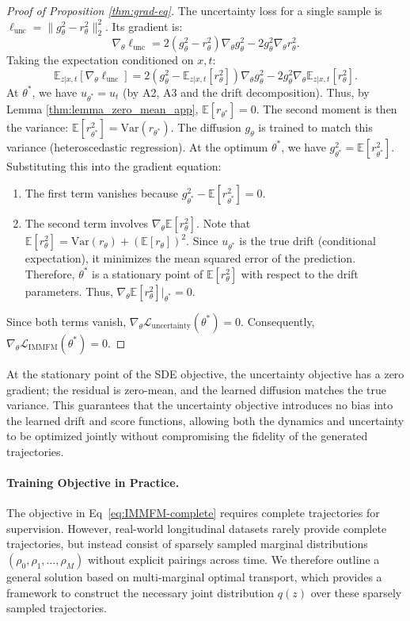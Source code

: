 \documentclass[twoside]{article}
\begin{document}
{{\begin{proof}[Proof of Proposition \ref{thm:grad-eq}]
The uncertainty loss for a single sample is $\ell_{\text{unc}} = \|g_\theta^2 - r_\theta^2\|_2^2$. Its gradient is:
\[
\nabla_\theta \ell_{\text{unc}} = 2(g_\theta^2 - r_\theta^2)\nabla_\theta g_\theta^2 - 2g_\theta^2 \nabla_\theta r_\theta^2.
\]
Taking the expectation conditioned on $x,t$:
\[
\mathbb{E}_{z|x,t}[\nabla_\theta \ell_{\text{unc}}] = 2(g_\theta^2 - \mathbb{E}_{z|x,t}[r_\theta^2])\nabla_\theta g_\theta^2 - 2g_\theta^2 \nabla_\theta \mathbb{E}_{z|x,t}[r_\theta^2].
\]
At $\theta^*$, we have $u_{\theta^*} = u_t$ (by A2, A3 and the drift decomposition). Thus, by Lemma \ref{thm:lemma_zero_mean_app}, $\mathbb{E}[r_{\theta^*}] = 0$.
The second moment is then the variance: $\mathbb{E}[r_{\theta^*}^2] = \text{Var}(r_{\theta^*})$.
The diffusion $g_{\theta}$ is trained to match this variance (heteroscedastic regression). At the optimum $\theta^*$, we have $g_{\theta^*}^2 = \mathbb{E}[r_{\theta^*}^2]$.
Substituting this into the gradient equation:
\begin{enumerate}
    \item The first term vanishes because $g_{\theta^*}^2 - \mathbb{E}[r_{\theta^*}^2] = 0$.
    \item The second term involves $\nabla_\theta \mathbb{E}[r_\theta^2]$. Note that $\mathbb{E}[r_\theta^2] = \text{Var}(r_\theta) + (\mathbb{E}[r_\theta])^2$. Since $u_{\theta^*}$ is the true drift (conditional expectation), it minimizes the mean squared error of the prediction. Therefore, $\theta^*$ is a stationary point of $\mathbb{E}[r_\theta^2]$ with respect to the drift parameters. Thus, $\nabla_\theta \mathbb{E}[r_\theta^2]|_{\theta^*} = 0$.
\end{enumerate}
Since both terms vanish, $\nabla_\theta \mathcal{L}_{\text{uncertainty}}(\theta^*) = 0$.
Consequently, $\nabla_\theta \mathcal{L}_{\text{IMMFM}}(\theta^*) = 0$.
\end{proof}
}




At the stationary point of the SDE objective, the uncertainty objective has a zero gradient; the residual is zero-mean, and the learned diffusion matches the true variance. This guarantees that the uncertainty objective introduces no bias into the learned drift and score functions, allowing both the dynamics and uncertainty to be optimized jointly without compromising the fidelity of the generated trajectories.
}

\paragraph{Training Objective in Practice.}
The objective in Eq~\eqref{eq:IMMFM-complete} requires complete trajectories for supervision. However, real-world longitudinal datasets rarely provide complete trajectories, but instead consist of sparsely sampled marginal distributions $(\rho_0, \rho_1, \ldots, \rho_M)$ without explicit pairings across time.
We therefore outline a general solution based on multi-marginal optimal transport, which provides a framework to construct the necessary joint distribution $q(z)$ over these sparsely sampled trajectories.
\end{document}
